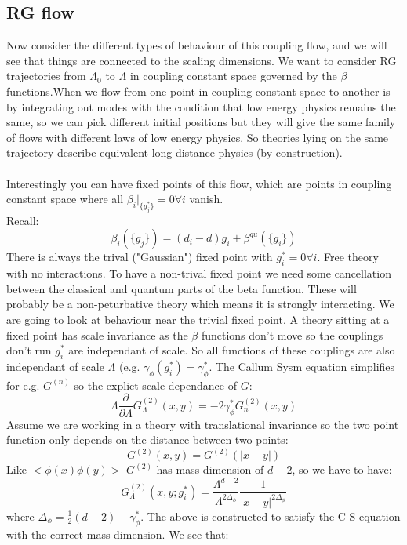 \documentclass{article}
\begin{document}
  \subsection{RG flow}
  Now consider the different types of behaviour of this coupling flow, and we will see that things are connected to the scaling dimensions. We want to consider RG trajectories from $\Lambda_0$ to $\Lambda$ in coupling constant space governed by the $\beta$ functions.When we flow from one point in coupling constant space to another is by integrating out modes with the condition that low energy physics remains the same, so we can pick different initial positions but they will give the same family of flows with different laws of low energy physics. So theories lying on the same trajectory describe equivalent long distance physics (by construction).\\\\
  Interestingly you can have fixed points of this flow, which are points in coupling constant space where all $\beta_i|_{\{g^*_j\}} = 0 \forall i$ vanish. \\
  Recall:
  $$
   \beta_i ( \{ g_j\}) = (d_i - d) g_i + \beta^{qu}( \{ g_i\})
  $$
  There is always the trival ("Gaussian") fixed point with $g_i^* = 0 \forall i$. Free theory with no interactions. To have a non-trival fixed point we need some cancellation between the classical and quantum parts of the beta function. These will probably be a non-peturbative theory which means it is strongly interacting. We are going to look at behaviour near the trivial fixed point. A theory sitting at a fixed point has scale invariance as the $\beta$ functions don't move so the couplings don't run $g_i^*$ are independant of scale. So all functions of these couplings are also independant of scale $\Lambda$ (e.g. $\gamma_{\phi} ( g_i^*) = \gamma_{\phi}^*$. The Callum Sysm equation simplifies for e.g. $G^{(n)}$ so the explict scale dependance of $G$:
  $$
   \Lambda \frac{\partial}{\partial \Lambda} G_{\Lambda}^{(2)} (x,y) = - 2 \gamma_{\phi}^* G_n^{(2)} (x,y)
  $$
Assume we are working in a theory with translational invariance so the two point function only depends on the distance between two points:
$$
 G^{(2)} (x,y) = G^{(2)} (|x-y|)
$$
Like $<\phi(x) \phi(y)>$ $G^{(2)}$ has mass dimension of $d-2$, so we have to have:
$$
G^{(2)}_{\Lambda} (x,y; g_i^*) = \frac{\Lambda^{d-2}}{ \Lambda^{2 \Delta_{\phi}}} \frac{1}{|x-y|^{2 \Delta_{\phi}}}
$$
where $\Delta_{\phi} = \frac{1}{2} (d-2) - \gamma_{\phi}^*$. The above is constructed to satisfy the C-S equation with the correct mass dimension. We see that:
\end{document}
